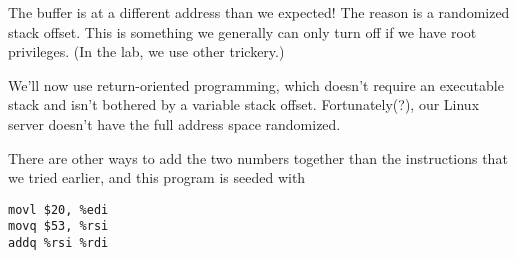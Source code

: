 \documentclass{article}
\begin{document}
The buffer is at a different address than we expected!
The reason is a randomized stack offset.
This is something we generally can only turn off if we have root privileges.
(In the lab, we use other trickery.)

%
%
%
%

We'll now use return-oriented programming, which doesn't require an executable stack and isn't bothered by a variable stack offset. Fortunately(?), our Linux server doesn't have the full address space randomized.

There are other ways to add the two numbers together than the instructions that we tried earlier, and this program is seeded with
\begin{lstlisting}[language={[x86masm]Assembler}]
movl $20, %edi
movq $53, %rsi
addq %rsi %rdi
\end{lstlisting}
\end{document}
